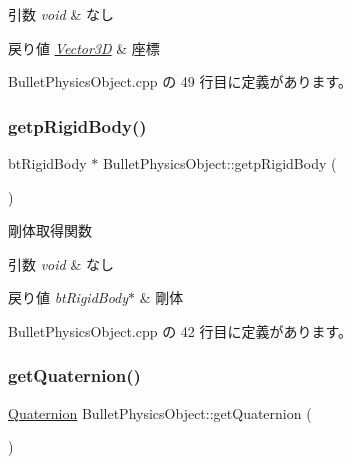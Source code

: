 \begin{DoxyParams}{引数}
{\em void} & なし \\
\hline
\end{DoxyParams}

\begin{DoxyRetVals}{戻り値}
{\em \mbox{\hyperlink{class_vector3_d}{Vector3D}}} & 座標 \\
\hline
\end{DoxyRetVals}


 Bullet\+Physics\+Object.\+cpp の 49 行目に定義があります。

\mbox{\label{class_bullet_physics_object_a711db1c0266db2f0fc3d8baa44c6e1ab}} 
\subsubsection{\texorpdfstring{getp\+Rigid\+Body()}{getpRigidBody()}}
{\footnotesize\ttfamily bt\+Rigid\+Body $\ast$ Bullet\+Physics\+Object\+::getp\+Rigid\+Body (\begin{DoxyParamCaption}{ }\end{DoxyParamCaption})}



剛体取得関数 


\begin{DoxyParams}{引数}
{\em void} & なし \\
\hline
\end{DoxyParams}

\begin{DoxyRetVals}{戻り値}
{\em bt\+Rigid\+Body$\ast$} & 剛体 \\
\hline
\end{DoxyRetVals}


 Bullet\+Physics\+Object.\+cpp の 42 行目に定義があります。

\mbox{\label{class_bullet_physics_object_a58f4fe83f0fe1f298b6e1fef14306903}} 
\subsubsection{\texorpdfstring{get\+Quaternion()}{getQuaternion()}}
{\footnotesize\ttfamily \mbox{\hyperlink{_vector3_d_8h_a3ee38c9c46d9851e33a9a1113328dafc}{Quaternion}} Bullet\+Physics\+Object\+::get\+Quaternion (\begin{DoxyParamCaption}{ }\end{DoxyParamCaption})}



